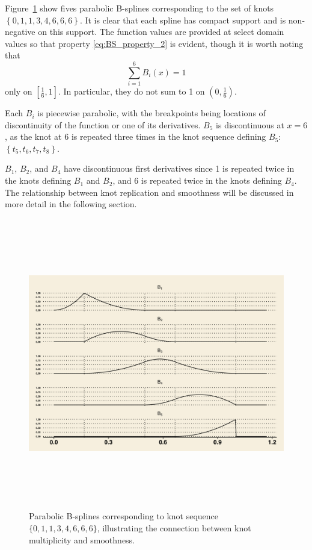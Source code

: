 \documentclass[12pt]{article}
\newenvironment{example}[1][Example]{\begin{trivlist}
\item[\hskip \labelsep {\bfseries #1}]}{\end{trivlist}}
\begin{document}
\begin{example}
Figure~\ref{fig:deboor_bspline_basis} show fives parabolic B-splines corresponding to the set of knots $\left\{0,1,1,3,4,6,6,6 \right\}$. It is clear that each spline has compact support and is non-negative on this support. The function values are provided at select domain values so that property \ref{eq:BS_property_2} is evident, though it is worth noting that 
\[
\sum_{i=1}^6 B_i\left(x\right) = 1
\]
only on $\left[\frac{1}{6},1\right]$. In particular, they do not sum to 1 on $\left(0,\frac{1}{6}\right)$. 

Each $B_i$ is piecewise parabolic, with the breakpoints being locations of discontinuity of the function or one of its derivatives. $B_5$ is discontinuous at $x=6$, as the knot at 6 is repeated three times in the knot sequence defining $B_5$: $\left\{t_5,t_6,t_7,t_8\right\}$.

$B_1$, $B_2$, and $B_4$ have discontinuous first derivatives since 1 is repeated twice in the knots defining $B_1$ and $B_2$, and 6 is repeated twice in the knots defining $B_4$. The relationship between knot replication and smoothness will be discussed in more detail in the following section.

\begin{figure}[h]
 \begin{center}
 \graphicspath{{img/}}
  \includegraphics[width=7in, height=5in]{deboor_parabolic_bsplines.png}
  \caption{Parabolic B-splines corresponding to knot sequence $\{0,1,1,3,4,6,6,6\}$, illustrating the connection between knot multiplicity and smoothness.}\label{fig:deboor_bspline_basis}
\end{center}
\end{figure}
\end{example}
\end{document}
